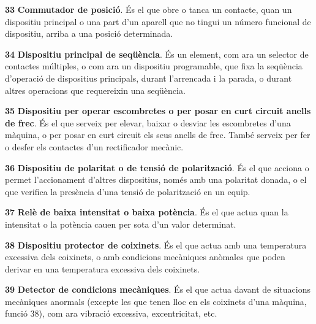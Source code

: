 \begin{multicols}{2}
\begin{list}{}
\item[\textbf{33}]  \textbf{Commutador de posici\'{o}}. \'{E}s el que
obre o tanca un contacte, quan un dispositiu principal o una part d'un aparell que no tingui un n\'{u}mero funcional de dispositiu, arriba a una posici\'{o} determinada.

\item[\textbf{34}]  \textbf{Dispositiu principal de
 seq\"{u}\`{e}ncia}. \'{E}s un element, com ara un selector de contactes m\'{u}ltiples, o com ara un
 dispositiu programable,
 que fixa la seq\"{u}\`{e}ncia d'operaci\'{o}
de dispositius principals, durant l'arrencada i la parada, o durant altres operacions
que requereixin una seq\"{u}\`{e}ncia.

\item[\textbf{35}]   \textbf{Dispositiu per operar escombretes o per posar en curt
circuit anells de frec}. \'{E}s el que serveix per elevar, baixar o
desviar les escombretes d'una m\`{a}quina, o per posar en curt circuit
els seus anells de frec. Tamb\'{e} serveix per fer o desfer els
contactes d'un rectificador mec\`{a}nic.

\item[\textbf{36}] 
\textbf{Dispositiu de polaritat o de tensi\'{o} de polaritzaci\'{o}}. \'{E}s el
que acciona o permet l'accionament d'altres dispositius, nom\'{e}s amb
una polaritat donada, o el que verifica la pres\`{e}ncia d'una tensi\'{o} de
polaritzaci\'{o} en un equip.

\item[\textbf{37}]  \textbf{Rel\`{e} de baixa
intensitat o baixa pot\`{e}ncia}. \'{E}s el que actua quan la intensitat o la pot\`{e}ncia cauen per
sota d'un valor determinat.

\item[\textbf{38}] 
\textbf{Dispositiu protector de coixinets}. \'{E}s el que actua amb una
temperatura excessiva dels coixinets, o amb condicions mec\`{a}niques
an\`{o}males que poden derivar en una temperatura excessiva dels
coixinets.

\item[\textbf{39}] 
\textbf{Detector de condicions mec\`{a}niques}. \'{E}s el que actua davant
de situacions mec\`{a}niques anormals (excepte les que tenen lloc en els
coixinets d'una m\`{a}quina, funci\'{o} 38), com ara vibraci\'{o} excessiva,
excentricitat, etc.


\end{list}
\end{multicols}
